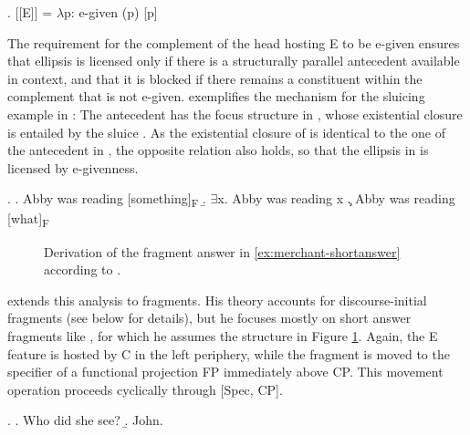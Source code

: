 \ex. [[E]] = $\lambda$p: e-given (p) [p] \hfill \citep[672]{merchant2004}

The requirement for the complement of the head hosting E to be e-given ensures that ellipsis is licensed only if there is a structurally parallel antecedent available in context, and that it is blocked if there remains a constituent within the complement that is not e-given. \Next exemplifies the mechanism for the sluicing example in \LLast: The antecedent has the focus structure in \Next[a], whose existential closure \Next[b] is entailed by the sluice \Next[c]. As the existential closure of \Next[c] is identical to the one of the antecedent in \Next[b], the opposite relation also holds, so that the ellipsis in \LLast is licensed by e-givenness.

\ex. \a. Abby was reading [something]\textsubscript{F}
     \b. $\exists$x. Abby was reading x
     \c. Abby was reading [what]\textsubscript{F}
     
\begin{figure}

\caption{Derivation of the fragment answer in \ref{ex:merchant-shortanswer} according to \citet{merchant2004}.\label{ex:merchant.structure-full}}
\end{figure}
%
\citet{merchant2004} extends this analysis to fragments. His theory accounts for discourse-initial fragments (see below for details), but he focuses mostly on short answer fragments like \Next, for which he assumes the structure in Figure \ref{ex:merchant.structure-full}. Again, the E feature is hosted by C in the left periphery, while the fragment is moved to the specifier of a functional projection FP immediately above CP. This movement operation proceeds cyclically through [Spec, CP].

\ex. \a. Who did she see? \hfill \citep[673]{merchant2004}
\b. John.\label{ex:merchant-shortanswer}

